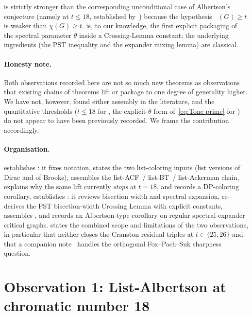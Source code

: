 \documentclass[11pt,a4paper]{article}
\theoremstyle{definition}
\DeclareMathOperator{\chl}{\chi_{\ell}}
\begin{document}
 is strictly stronger than the corresponding
unconditional case of Albertson's conjecture (namely
 at $t \le 18$, established by~\cite{Ackerman})
because the hypothesis $\chl(G) \ge t$ is weaker than $\chi(G) \ge t$.
 is, to our knowledge, the first explicit
packaging of the spectral parameter $\theta$ inside a Crossing-Lemma
constant; the underlying ingredients (the PST inequality and the
expander mixing lemma) are classical.

\paragraph{Honesty note.}
Both observations recorded here are not so much new theorems as
observations that existing chains of theorems lift or package to
one degree of generality higher. We have not, however, found
either assembly in the literature, and the quantitative thresholds
($t \le 18$ for , the explicit-$\theta$ form
of~\eqref{eq:Tone-prime} for ) do not appear
to have been previously recorded. We frame the contribution
accordingly.

\paragraph{Organisation.}
 establishes : it
fixes notation, states the two list-coloring inputs (list versions
of Dirac and of Brooks), assembles the list-ACF~/ list-BT~/
list-Ackerman chain, explains why the same lift currently
\emph{stops} at $t = 18$, and records a DP-coloring corollary.
 establishes : it
reviews bisection width and spectral expansion, re-derives the PST
bisection-width Crossing Lemma with explicit constants, assembles
, and records an Albertson-type corollary on
regular spectral-expander critical graphs.
 states the combined scope and limitations of the
two observations, in particular that neither closes the Cranston
residual triples at $t \in \{25, 26\}$ and that a companion
note~\cite{D8} handles the orthogonal Fox--Pach--Suk sharpness
question.

\section{Observation 1: List-Albertson at chromatic number 18}
\label{sec:list-albertson}
\end{document}
